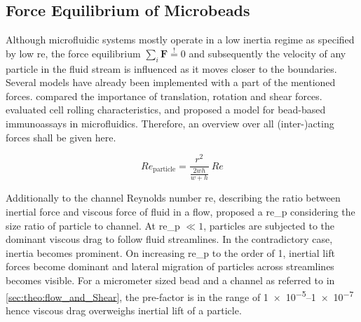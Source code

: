 \subsection{Force Equilibrium of Microbeads}
\label{sec:theo:force}
Although microfluidic systems mostly operate in a low inertia regime as specified by low \gls{re}, the force equilibrium $\sum_{i} \mathbf{F} \overset{!}{=} 0$ and subsequently the velocity of any particle in the fluid stream is influenced as it moves closer to the boundaries. Several models have already been implemented with a part of the mentioned forces. \citet{lit:fluid:comparison} compared the importance of translation, rotation and shear forces. \citet{lit:fluidics:RollingCharacteristics} evaluated cell rolling characteristics, and \citet{lit:fluidic:ModelMIT} proposed a model for bead-based immunoassays in microfluidics. Therefore, an overview over all (inter-)acting forces shall be given here.

\begin{equation}
	\mathit{Re}_\text{particle} = \frac{r^2}{\frac{2wh}{w+h}} \ \mathit{Re} 
\end{equation}

Additionally to the channel Reynolds number \gls{re}, describing the ratio between inertial force and viscous force of fluid in a flow, \citet{lit:fluidic:f_wall} proposed a \gls{re_p} considering the size ratio of particle to channel. At \gls{re_p} $\ll 1$, particles are subjected to the dominant viscous drag to follow fluid streamlines. In the contradictory case, inertia becomes prominent. On increasing \gls{re_p} to the order of 1, inertial lift forces become dominant and lateral migration of particles across streamlines becomes visible.  For a micrometer sized bead and a channel as referred to in \cref{sec:theo:flow_and_Shear}, the pre-factor is in the range of \numrange{1e-5}{1e-7} hence viscous drag overweighs inertial lift of a particle.

